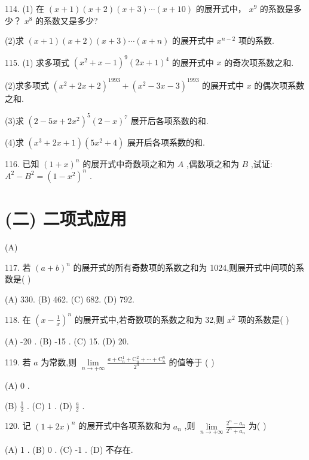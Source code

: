 \documentclass[10pt]{article}
\begin{document}
114. (1) 在 \(\left( {x + 1}\right) \left( {x + 2}\right) \left( {x + 3}\right) \cdots \left( {x + {10}}\right)\) 的展开式中， \({x}^{9}\) 的系数是多少？ \({x}^{8}\) 的系数又是多少?

(2)求 \(\left( {x + 1}\right) \left( {x + 2}\right) \left( {x + 3}\right) \cdots \left( {x + n}\right)\) 的展开式中 \({x}^{n - 2}\) 项的系数.

115. (1) 求多项式 \({\left( {x}^{2} + x - 1\right) }^{9}{\left( 2x + 1\right) }^{4}\) 的展开式中 \(x\) 的奇次项系数之和.

(2)求多项式 \({\left( {x}^{2} + {2x} + 2\right) }^{1993} + {\left( {x}^{2} - {3x} - 3\right) }^{1993}\) 的展开式中 \(x\) 的偶次项系数之和.

(3)求 \({\left( 2 - 5x + 2{x}^{2}\right) }^{5}{\left( 2 - x\right) }^{7}\) 展开后各项系数的和.

(4)求 \(\left( {{x}^{3} + {2x} + 1}\right) \left( {5{x}^{2} + 4}\right)\) 展开后各项系数的和.

116. 已知 \({\left( 1 + x\right) }^{n}\) 的展开式中奇数项之和为 \(A\) ,偶数项之和为 \(B\) ,试证: \({A}^{2} - {B}^{2} = {\left( 1 - {x}^{2}\right) }^{n}\) .

\section*{(二) 二项式应用}

(A)

117. 若 \({\left( a + b\right) }^{n}\) 的展开式的所有奇数项的系数之和为 1024,则展开式中间项的系数是( )

(A) 330. (B) 462. (C) 682. (D) 792.

118. 在 \({\left( x - \frac{1}{x}\right) }^{n}\) 的展开式中,若奇数项的系数之和为 32,则 \({x}^{2}\) 项的系数是( )

(A) -20 . (B) -15 . (C) 15. (D) 20.

119. 若 \(a\) 为常数,则 \(\mathop{\lim }\limits_{{n \rightarrow   + \infty }}\frac{a + {\mathrm{C}}_{n}^{1} + {\mathrm{C}}_{n}^{2} + \cdots  + {\mathrm{C}}_{n}^{n}}{{2}^{n}}\) 的值等于 ( )

(A) 0 .

(B) \(\frac{1}{2}\) . (C) 1 . (D) \(\frac{a}{2}\) .

120. 记 \({\left( 1 + 2x\right) }^{n}\) 的展开式中各项系数和为 \({a}_{n}\) ,则 \(\mathop{\lim }\limits_{{n \rightarrow   + \infty }}\frac{{2}^{n} - {a}_{n}}{{2}^{n} + {a}_{n}}\) 为(   )

(A) 1 . (B) 0 . (C) -1 . (D) 不存在.
\end{document}
